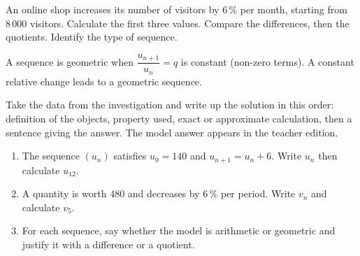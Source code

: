     \begin{activite}
    An online shop increases its number of visitors by $6\,\%$ per month, starting from $8\,000$ visitors. Calculate the first three values. Compare the differences, then the quotients. Identify the type of sequence.
    \begin{center}\end{center}
    \end{activite}

    \begin{traceecrite}A sequence is geometric when $\dfrac{u_{n+1}}{u_n}=q$ is constant (non-zero terms). A constant relative change leads to a geometric sequence.\end{traceecrite}

    \begin{exemple}
    Take the data from the investigation and write up the solution in this order: definition of the objects, property used, exact or approximate calculation, then a sentence giving the answer. The model answer appears in the teacher edition.
    \end{exemple}

    \begin{exercice}[-- essential]
    \begin{enumerate}\item The sequence $(u_n)$ satisfies $u_0=140$ and $u_{n+1}=u_n+6$. Write $u_n$ then calculate $u_{12}$.\item A quantity is worth $480$ and decreases by $6\,\%$ per period. Write $v_n$ and calculate $v_5$.\item For each sequence, say whether the model is arithmetic or geometric and justify it with a difference or a quotient.\end{enumerate}
    \end{exercice}

